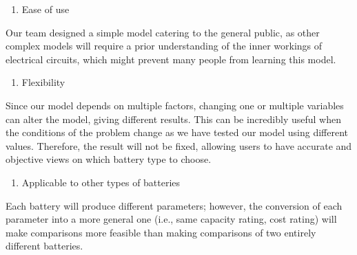 \begin{enumerate}
    \item Ease of use
\end{enumerate}
Our team designed a simple model catering to the general public, as other complex models will require a prior understanding of the inner workings of electrical circuits, which might prevent many people from learning this model.

\begin{enumerate}[resume]
    \item Flexibility
\end{enumerate}
Since our model depends on multiple factors, changing one or multiple variables can alter the model, giving different results. This can be incredibly useful when the conditions of the problem change as we have tested our model using different values. Therefore, the result will not be fixed, allowing users to have accurate and objective views on which battery type to choose.

\begin{enumerate}[resume]
    \item Applicable to other types of batteries
\end{enumerate}
Each battery will produce different parameters; however, the conversion of each parameter into a more general one (i.e., same capacity rating, cost rating) will make comparisons more feasible than making comparisons of two entirely different batteries.